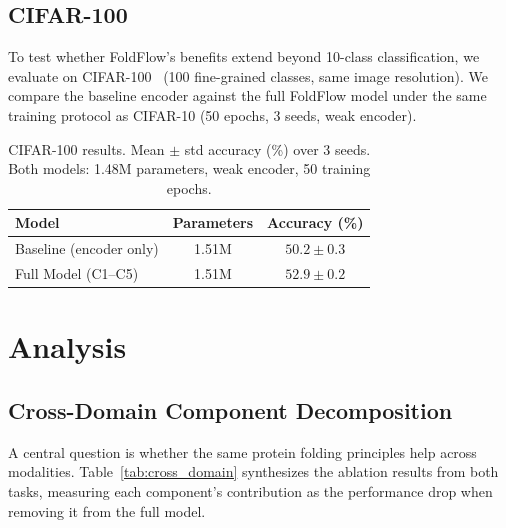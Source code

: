 \documentclass[10pt]{article}
\begin{document}
\subsection{CIFAR-100}
\label{sec:cifar100}

To test whether FoldFlow's benefits extend beyond 10-class
classification, we evaluate on CIFAR-100~\citep{krizhevsky2009cifar}
(100 fine-grained classes, same image resolution).  We compare the
baseline encoder against the full FoldFlow model under the same
training protocol as CIFAR-10 (50 epochs, 3 seeds, weak encoder).

\begin{table}[t]
\centering
\caption{CIFAR-100 results.  Mean $\pm$ std accuracy (\%) over 3 seeds.
  Both models: 1.48M parameters, weak encoder, 50 training epochs.}
\label{tab:cifar100}
\small
\begin{tabular}{@{}lcc@{}}
\toprule
Model & Parameters & Accuracy (\%) \\
\midrule
Baseline (encoder only) & 1.51M & $50.2 \pm 0.3$ \\
Full Model (C1--C5)     & 1.51M & $\mathbf{52.9 \pm 0.2}$ \\
\bottomrule
\end{tabular}
\end{table}

\section{Analysis}
\label{sec:analysis}

\subsection{Cross-Domain Component Decomposition}
\label{sec:cross_domain}

A central question is whether the same protein folding principles help
across modalities.  Table~\ref{tab:cross_domain} synthesizes the
ablation results from both tasks, measuring each component's
contribution as the performance drop when removing it from the full
model.
\end{document}
